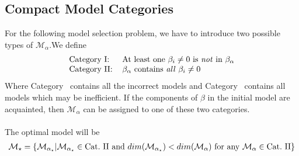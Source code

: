 \documentclass[Research_Module_ES.tex]{subfiles}
\begin{document}
\subsection{Compact Model Categories} \label{chapter_compact_model}
For the following model selection problem, we have to introduce two possible types of $\mathcal{M}_\alpha$.We define
\begin{align*}
\begin{tabular}{ll}
Category~\RM{1}:& At least one $\beta_i\neq 0$ is \textit{not} in $\beta_\alpha$\\
Category~\RM{2}:& $\beta_\alpha$ contains \textit{all} $\beta_i\neq 0$
\end{tabular}
\end{align*}
Where Category~ contains all the incorrect models and Category~ contains all models which may be inefficient. If the components of $\beta$ in the initial model are acquainted, then $\mathcal{M}_\alpha$ can be assigned to one of these two categories.\\\\
The optimal model will be
\begin{align*}
\mathcal{M}_\star=\{\mathcal{M}_{\alpha_\star}|\mathcal{M}_{\alpha_\star}\in \text{Cat.~\RM{2}~and~} dim(\mathcal{M}_{\alpha_\star})<dim(\mathcal{M}_{\alpha})\text{~for~any~}\mathcal{M}_{\alpha}\in \text{Cat.~\RM{2}} \}
\end{align*}
\end{document}
